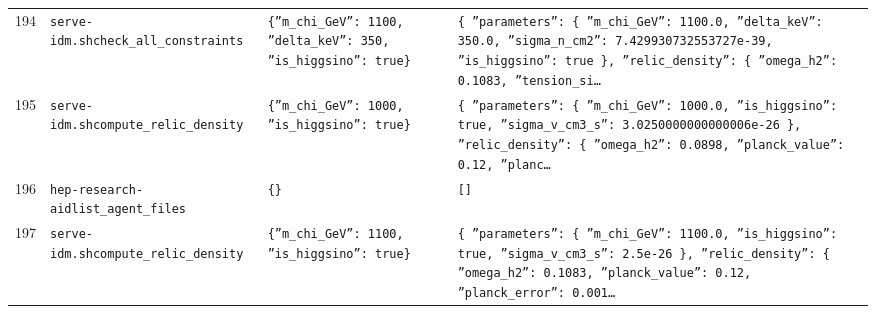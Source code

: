 \documentclass[11pt,a4paper]{article}
\begin{document}
\begin{longtable}{@{}p{}p{}p{}p{}@{}}
194 & \texttt{serve-idm.sh}\newline\texttt{check\_\allowbreak{}all\_\allowbreak{}constraints} & \texttt{\{''m\_\allowbreak{}chi\_\allowbreak{}GeV'':\allowbreak{} 1100,\allowbreak{} ''delta\_\allowbreak{}keV'':\allowbreak{} 350,\allowbreak{} ''is\_\allowbreak{}higgsino'':\allowbreak{} true\}\allowbreak{}} & \texttt{\{   ''parameters'':\allowbreak{} \{     ''m\_\allowbreak{}chi\_\allowbreak{}GeV'':\allowbreak{} 1100.0,\allowbreak{}     ''delta\_\allowbreak{}keV'':\allowbreak{} 350.0,\allowbreak{}     ''sigma\_\allowbreak{}n\_\allowbreak{}cm2'':\allowbreak{} 7.429930732553727e-39,\allowbreak{}     ''is\_\allowbreak{}higgsino'':\allowbreak{} true   \}\allowbreak{},\allowbreak{}   ''relic\_\allowbreak{}density'':\allowbreak{} \{     ''omega\_\allowbreak{}h2'':\allowbreak{} 0.1083,\allowbreak{}     ''tension\_\allowbreak{}si\ldots{}\allowbreak{}} \\
195 & \texttt{serve-idm.sh}\newline\texttt{compute\_\allowbreak{}relic\_\allowbreak{}density} & \texttt{\{''m\_\allowbreak{}chi\_\allowbreak{}GeV'':\allowbreak{} 1000,\allowbreak{} ''is\_\allowbreak{}higgsino'':\allowbreak{} true\}\allowbreak{}} & \texttt{\{   ''parameters'':\allowbreak{} \{     ''m\_\allowbreak{}chi\_\allowbreak{}GeV'':\allowbreak{} 1000.0,\allowbreak{}     ''is\_\allowbreak{}higgsino'':\allowbreak{} true,\allowbreak{}     ''sigma\_\allowbreak{}v\_\allowbreak{}cm3\_\allowbreak{}s'':\allowbreak{} 3.0250000000000006e-26   \}\allowbreak{},\allowbreak{}   ''relic\_\allowbreak{}density'':\allowbreak{} \{     ''omega\_\allowbreak{}h2'':\allowbreak{} 0.0898,\allowbreak{}     ''planck\_\allowbreak{}value'':\allowbreak{} 0.12,\allowbreak{}     ''planc\ldots{}\allowbreak{}} \\
196 & \texttt{hep-research-aid}\newline\texttt{list\_\allowbreak{}agent\_\allowbreak{}files} & \texttt{\{\}\allowbreak{}} & \texttt{[]\allowbreak{}} \\
197 & \texttt{serve-idm.sh}\newline\texttt{compute\_\allowbreak{}relic\_\allowbreak{}density} & \texttt{\{''m\_\allowbreak{}chi\_\allowbreak{}GeV'':\allowbreak{} 1100,\allowbreak{} ''is\_\allowbreak{}higgsino'':\allowbreak{} true\}\allowbreak{}} & \texttt{\{   ''parameters'':\allowbreak{} \{     ''m\_\allowbreak{}chi\_\allowbreak{}GeV'':\allowbreak{} 1100.0,\allowbreak{}     ''is\_\allowbreak{}higgsino'':\allowbreak{} true,\allowbreak{}     ''sigma\_\allowbreak{}v\_\allowbreak{}cm3\_\allowbreak{}s'':\allowbreak{} 2.5e-26   \}\allowbreak{},\allowbreak{}   ''relic\_\allowbreak{}density'':\allowbreak{} \{     ''omega\_\allowbreak{}h2'':\allowbreak{} 0.1083,\allowbreak{}     ''planck\_\allowbreak{}value'':\allowbreak{} 0.12,\allowbreak{}     ''planck\_\allowbreak{}error'':\allowbreak{} 0.001\ldots{}\allowbreak{}} \\

\end{longtable}
\end{document}
